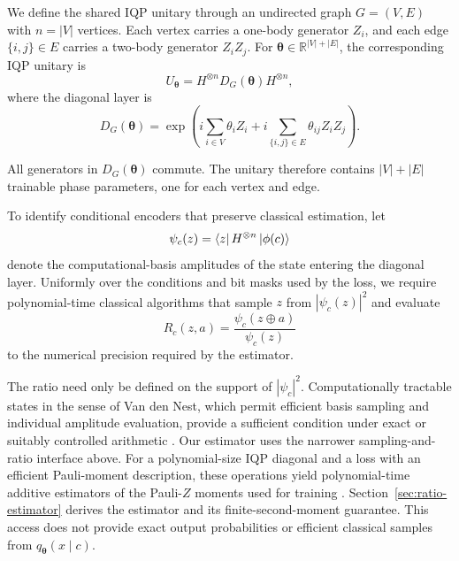 \documentclass[pra,aps,10pt,twocolumn,floatfix,superscriptaddress,
notitlepage,longbibliography]{revtex4-2}
\begin{document}
We define the shared IQP unitary through an undirected graph $G=(V,E)$ with $n=|V|$ vertices. Each vertex carries a one-body generator $Z_i$, and each edge $\{i,j\}\in E$ carries a two-body generator $Z_iZ_j$. For $\boldsymbol{\theta}\in\mathbb{R}^{|V|+|E|}$, the corresponding IQP unitary is
\begin{equation}
    U_{\boldsymbol{\theta}}=H^{\otimes n}D_G(\boldsymbol{\theta})H^{\otimes n},
    \label{eq:iqp-unitary}
\end{equation}
where the diagonal layer is
\begin{equation}
    D_G(\boldsymbol{\theta})=\exp\left(i\sum_{i\in V}\theta_iZ_i+i\sum_{\{i,j\}\in E}\theta_{ij}Z_iZ_j\right).
    \label{eq:graph-diagonal}
\end{equation}

All generators in $D_G(\boldsymbol{\theta})$ commute. The unitary therefore contains $|V|+|E|$ trainable phase parameters, one for each vertex and edge.

To identify conditional encoders that preserve classical estimation, let
\begin{equation}
    \psi_c(z)=\bra{z}H^{\otimes n}\ket{\phi(c)}
    \label{eq:reference-amplitude}
\end{equation}
denote the computational-basis amplitudes of the state entering the diagonal layer. Uniformly over the conditions and bit masks used by the loss, we require polynomial-time classical algorithms that sample $z$ from $|\psi_c(z)|^2$ and evaluate
\begin{equation}
    R_c(z,a)=\frac{\psi_c(z\oplus a)}{\psi_c(z)}
    \label{eq:amplitude-ratio}
\end{equation}
to the numerical precision required by the estimator.

The ratio need only be defined on the support of $|\psi_c|^2$. Computationally tractable states in the sense of Van den Nest, which permit efficient basis sampling and individual amplitude evaluation, provide a sufficient condition under exact or suitably controlled arithmetic \cite{nestSimulatingQuantumComputers2011}. Our estimator uses the narrower sampling-and-ratio interface above. For a polynomial-size IQP diagonal and a loss with an efficient Pauli-moment description, these operations yield polynomial-time additive estimators of the Pauli-$Z$ moments used for training \cite{recio-armengolIQPoptFastOptimization2025,recio-armengolTrainClassicalDeploy2026}. Section~\ref{sec:ratio-estimator} derives the estimator and its finite-second-moment guarantee. This access does not provide exact output probabilities or efficient classical samples from $q_{\boldsymbol{\theta}}(x\mid c)$.
\end{document}
